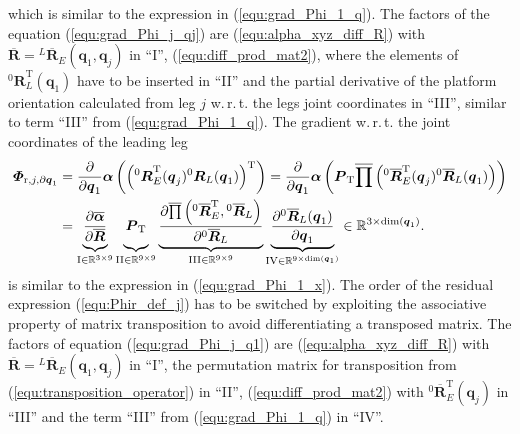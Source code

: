 \documentclass[robotics,article,submit,moreauthors,pdftex]{Definitions/mdpi}
\newcommand{\bm}[1]{\boldsymbol{#1}}
\newcommand{\rotmat}[2]{{{ }^{#1}\boldsymbol{R}}_{#2}}
\newcommand{\rotmato}[2]{{{ }^{#1}\boldsymbol{\overline{R}}}_{#2}}
\newcommand{\transp}[0]{{\mathrm{T}}}
\let\Phi\varPhi
\begin{document}
%
which is similar to the expression in (\ref{equ:grad_Phi_1_q}).
The factors of the equation (\ref{equ:grad_Phi_j_qj}) are
(\ref{equ:alpha_xyz_diff_R}) with $\overline{\bm{R}}=\rotmato{L}{E}(\bm{q}_1,\bm{q}_j)$ in ``I'',
(\ref{equ:diff_prod_mat2}), where the elements of $\rotmat{0}{L}^\transp(\bm{q}_1)$ have to be inserted in ``II'' and
the partial derivative of the platform orientation calculated from leg $j$ w.\,r.\,t. the legs joint coordinates in ``III'', similar to term ``III'' from (\ref{equ:grad_Phi_1_q}).
%
The gradient w.\,r.\,t. the joint coordinates of the leading leg
%
\begin{align}
\bm{\Phi}_{\mathrm{r},j,\partial\bm{q}_1}
&=
\frac{\partial}{\partial \bm{q}_1} \bm{\alpha}\left(\left(\rotmat{0}{E}^\transp(\bm{q}_j) \rotmat{0}{L}(\bm{q}_1) \right)^\transp \right)
=
\frac{\partial}{\partial \bm{q}_1} \bm{\alpha}\left(\bm{P}_{\mathrm{T}}\overline{\prod}\left( \rotmato{0}{E}^\transp(\bm{q}_j) \rotmato{0}{L}(\bm{q}_1)\right)\right)  \label{equ:grad_Phi_j_q1}\\
&=
\underbrace{
	\vphantom{\frac{\partial \overline{\prod}\left( \rotmato{0}{E}^\transp, \rotmato{0}{D}\right)}{\partial \rotmato{0}{D}}}
	\frac{\partial \overline{\bm{\alpha}}}{\partial \overline{\bm{R}}}
	}_{\mathrm{I} \in {\mathbb{R}}^{3 \times 9}}
\underbrace{
	\vphantom{\frac{\partial \overline{\prod}\left( \rotmato{0}{E}^\transp, \rotmato{0}{D}\right)}{\partial \rotmato{0}{D}}}
	\bm{P}_{\mathrm{T}}
	}_{\mathrm{II} \in {\mathbb{R}}^{9 \times 9}}
\underbrace{
	\frac{\partial \overline{\prod}\left( \rotmato{0}{E}^\transp, \rotmato{0}{L}\right)}{\partial \rotmato{0}{L}}
	}_{\mathrm{III} \in {\mathbb{R}}^{9 \times 9}}
\underbrace{
	\frac{\partial \rotmato{0}{L}(\bm{q}_1)}{\partial \bm{q}_1}
	}_{\mathrm{IV} \in {\mathbb{R}}^{9 \times \mathrm{dim}(\bm{q}_1)}}
\in {\mathbb{R}}^{3 \times \mathrm{dim}(\bm{q}_1)}. \nonumber
\end{align}
%
is similar to the expression in (\ref{equ:grad_Phi_1_x}).
The order of the residual expression (\ref{equ:Phir_def_j}) has to be switched by exploiting the associative property of matrix transposition to avoid differentiating a transposed matrix.
The factors of equation (\ref{equ:grad_Phi_j_q1}) are
(\ref{equ:alpha_xyz_diff_R}) with $\overline{\bm{R}}=\rotmato{L}{E}(\bm{q}_1,\bm{q}_j)$ in ``I'',
the permutation matrix for transposition from (\ref{equ:transposition_operator}) in ``II'',
(\ref{equ:diff_prod_mat2}) with $\rotmato{0}{E}^\transp(\bm{q}_j)$ in ``III'' and
the term ``III'' from (\ref{equ:grad_Phi_1_q}) in ``IV''.
\end{document}
